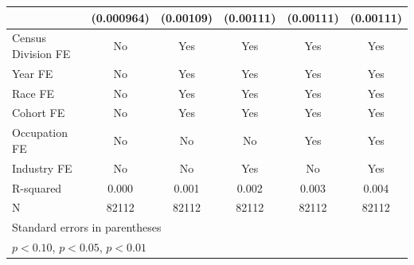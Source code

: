 {\begin{tabular}{l*{5}{c}}
                    &  (0.000964)         &   (0.00109)         &   (0.00111)         &   (0.00111)         &   (0.00111)         \\
\hline
Census Division FE  &          No         &         Yes         &         Yes         &         Yes         &         Yes         \\
Year FE             &          No         &         Yes         &         Yes         &         Yes         &         Yes         \\
Race FE             &          No         &         Yes         &         Yes         &         Yes         &         Yes         \\
Cohort FE           &          No         &         Yes         &         Yes         &         Yes         &         Yes         \\
Occupation FE       &          No         &          No         &          No         &         Yes         &         Yes         \\
Industry FE         &          No         &          No         &         Yes         &          No         &         Yes         \\
R-squared           &       0.000         &       0.001         &       0.002         &       0.003         &       0.004         \\
N                   &       82112         &       82112         &       82112         &       82112         &       82112         \\
\hline\hline
\multicolumn{6}{l}{\footnotesize Standard errors in parentheses}\\
\multicolumn{6}{l}{\footnotesize \sym{*} \(p<0.10\), \sym{**} \(p<0.05\), \sym{***} \(p<0.01\)}\\
\end{tabular}
}
